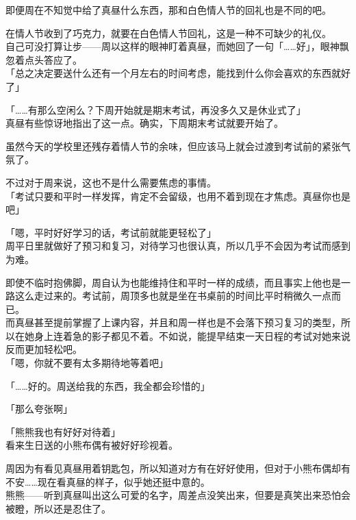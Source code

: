 即便周在不知觉中给了真昼什么东西，那和白色情人节的回礼也是不同的吧。

在情人节收到了巧克力，就要在白色情人节回礼，这是一种不可缺少的礼仪。\\

自己可没打算让步——周以这样的眼神盯着真昼，而她回了一句「……好」，眼神飘忽着点头答应了。\\

「总之决定要送什么还有一个月左右的时间考虑，能找到什么你会喜欢的东西就好了」

「……有那么空闲么？下周开始就是期末考试，再没多久又是休业式了」\\

真昼有些惊讶地指出了这一点。确实，下周期末考试就要开始了。

虽然今天的学校里还残存着情人节的余味，但应该马上就会过渡到考试前的紧张气氛了。

不过对于周来说，这也不是什么需要焦虑的事情。\\

「考试只要和平时一样发挥，肯定不会留级，也用不着到现在才焦虑。真昼你也是吧」

「嗯，平时好好学习的话，考试前就能更轻松了」\\

周平日里就做好了预习和复习，对待学习也很认真，所以几乎不会因为考试而感到为难。

即使不临时抱佛脚，周自认为也能维持住和平时一样的成绩，而且事实上他也是一路这么走过来的。考试前，周顶多也就是坐在书桌前的时间比平时稍微久一点而已。\\

而真昼甚至提前掌握了上课内容，并且和周一样也是不会落下预习复习的类型，所以在她身上连着急的影子都见不着。不如说，能提早结束一天日程的考试对她来说反而更加轻松吧。\\

「嗯，你就不要有太多期待地等着吧」

「……好的。周送给我的东西，我全都会珍惜的」

「那么夸张啊」

「熊熊我也有好好对待着」\\

看来生日送的小熊布偶有被好好珍视着。

周因为有看见真昼用着钥匙包，所以知道对方有在好好使用，但对于小熊布偶却有不安……现在看真昼的样子，似乎她还挺中意的。\\

熊熊——听到真昼叫出这么可爱的名字，周差点没笑出来，但要是真笑出来恐怕会被瞪，所以还是忍住了。\\

